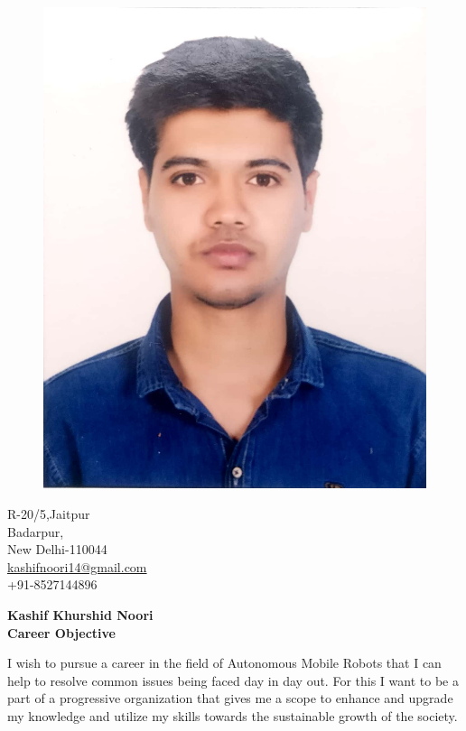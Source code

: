 \documentclass[a4paper,12pt,final]{memoir}
\newcommand{\SmallSep}{\vspace{0.5em}}
\newcommand{\CVSection}[1]
	{\Large\textbf{#1}\par
	\SmallSep\normalsize\normalfont}
\begin{document}
\begin{figure}
	\hfill
	\center
	\includegraphics[width=0.6\columnwidth]{kashif}
	\vspace{-7cm}	
	

\end{figure}

\begin{center}\small
	R-20/5,Jaitpur \\
	\hspace{-5pt}Badarpur,\\New Delhi-110044	\\\vspace{1pt}
	\url{kashifnoori14@gmail.com}\\\vspace{1pt}
	+91-8527144896	
	 
\end{center}\normalsize
\framebreak
\Huge\bfseries {\color{RoyalBlue} Kashif Khurshid Noori} \\

\normalsize\normalfont
\CVSection{Career Objective}
I wish to pursue a career in the field of Autonomous Mobile Robots that I can help to resolve common issues being faced day in day out. For this I want to be a part of a progressive organization that gives me a scope to enhance and upgrade my knowledge and utilize my skills towards the sustainable growth of the society.\\
\end{document}
